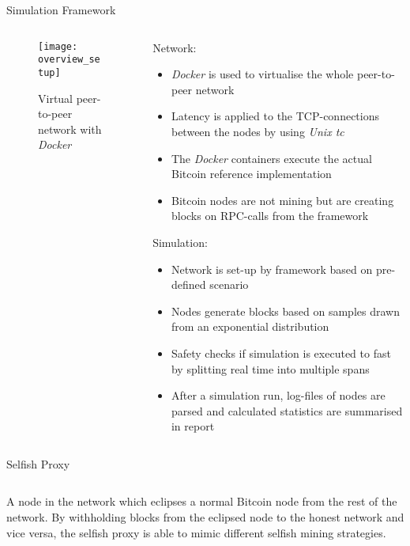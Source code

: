 \documentclass[final,hyperref={pdfpagelabels=true}]{beamer}
\begin{document}
\begin{frame}
  \begin{block}{Simulation Framework}
  \begin{columns}[t]

    \begin{column}{.3\textwidth}
		
		\begin{figure}[t]
		    \vspace*{-1cm}
			\texttt{[image: overview\_setup]}
			\centering
			\caption{Virtual peer-to-peer network with \textit{Docker}}
		\end{figure}      	
      
    \end{column}

    \begin{column}{.6\textwidth}
    	Network:
     	\begin{itemize}
     		\item \textit{Docker} is used to virtualise the whole peer-to-peer network
     		\item Latency is applied to the TCP-connections between the nodes by using \textit{Unix tc}
     		\item The \textit{Docker} containers execute the actual Bitcoin reference implementation
     		\item Bitcoin nodes are not mining but are creating blocks on RPC-calls from the framework
     	\end{itemize}
     	Simulation:
       	\begin{itemize}
     		\item Network is set-up by framework based on pre-defined scenario
     		\item Nodes generate blocks based on samples drawn from an exponential distribution
     		\item Safety checks if simulation is executed to fast by splitting real time into multiple spans
     		\item After a simulation run, log-files of nodes are parsed and calculated statistics are summarised in report 	\end{itemize}
    \end{column}

  \end{columns}
  \end{block}
  
  \begin{block}{Selfish Proxy}
  	\begin{columns}[t]
     	\begin{column}{.45\textwidth}
     		A node in the network which eclipses a normal Bitcoin node from the rest of the network. By withholding blocks from the eclipsed node to the honest network and vice versa, the selfish proxy is able to mimic different selfish mining strategies.
     		

\end{column}
\end{columns}
\end{block}
\end{frame}
\end{document}
